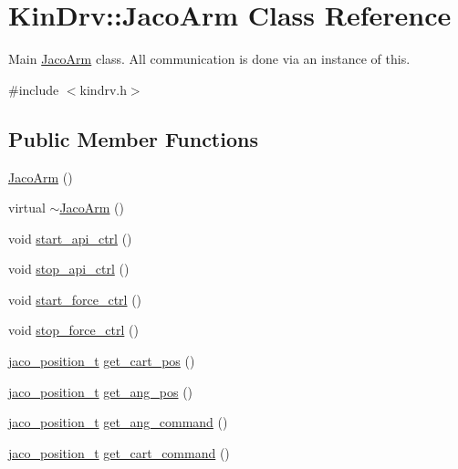 \hypertarget{classKinDrv_1_1JacoArm}{\section{Kin\+Drv\+:\+:Jaco\+Arm Class Reference}
\label{classKinDrv_1_1JacoArm}
}


Main \hyperlink{classKinDrv_1_1JacoArm}{Jaco\+Arm} class. All communication is done via an instance of this.  




{\ttfamily \#include $<$kindrv.\+h$>$}

\subsection*{Public Member Functions}
\begin{DoxyCompactItemize}
\item 
\hyperlink{classKinDrv_1_1JacoArm_a8bd45735eaedf0f8d46438db56b10c37}{Jaco\+Arm} ()
\item 
virtual \hyperlink{classKinDrv_1_1JacoArm_a9c24173ba8bdf9c8ed28a59ff164f6f4}{$\sim$\+Jaco\+Arm} ()
\item 
void \hyperlink{classKinDrv_1_1JacoArm_a58369e40d4e2318a98aeaef5fa6eeaaa}{start\+\_\+api\+\_\+ctrl} ()
\item 
void \hyperlink{classKinDrv_1_1JacoArm_acc1f07e5c188112b64559539a6cb17b4}{stop\+\_\+api\+\_\+ctrl} ()
\item 
void \hyperlink{classKinDrv_1_1JacoArm_a8e9a21dc89ee54fb3b63f40f4bbdd41c}{start\+\_\+force\+\_\+ctrl} ()
\item 
void \hyperlink{classKinDrv_1_1JacoArm_aa07abef77c6e63f0d372cf156f5bfb31}{stop\+\_\+force\+\_\+ctrl} ()
\item 
\hyperlink{structKinDrv_1_1jaco__position__t}{jaco\+\_\+position\+\_\+t} \hyperlink{classKinDrv_1_1JacoArm_a9a4ce94d8fd98a0c338ba0b8438ffcae}{get\+\_\+cart\+\_\+pos} ()
\item 
\hyperlink{structKinDrv_1_1jaco__position__t}{jaco\+\_\+position\+\_\+t} \hyperlink{classKinDrv_1_1JacoArm_a9bcc64b3bf31f125b3506fa0724f1d81}{get\+\_\+ang\+\_\+pos} ()
\item 
\hyperlink{structKinDrv_1_1jaco__position__t}{jaco\+\_\+position\+\_\+t} \hyperlink{classKinDrv_1_1JacoArm_a3f65933db4a4f474393b92d3627b60e6}{get\+\_\+ang\+\_\+command} ()
\item 
\hyperlink{structKinDrv_1_1jaco__position__t}{jaco\+\_\+position\+\_\+t} \hyperlink{classKinDrv_1_1JacoArm_a6506ed713fd777a9aecce955aee71a88}{get\+\_\+cart\+\_\+command} ()

\end{DoxyCompactItemize}
